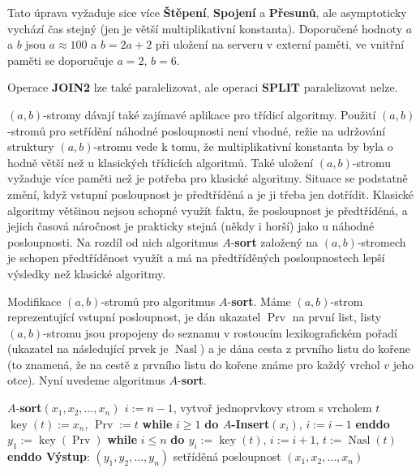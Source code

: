 \documentclass[a4paper,12pt]{article}
\DeclareMathOperator*{\Prv}{Prv}
\DeclareMathOperator*{\Nasl}{Nasl}
\DeclareMathOperator*{\key}{key}
\begin{document}
Tato úprava vyžaduje sice více {\bf Štěpení}, {\bf Spojení} a
{\bf Přesunů}, ale asymptoticky vychází čas stejný 
(jen je větší multiplikativní konstanta). Doporučené 
hodnoty $a$ a $b$ jsou $a\approx 100$ a $b=2a+2$ při uložení na serveru 
v externí paměti, ve vnitřní paměti 
se doporučuje $a=2$, $b=6$.

Operace {\bf JOIN2} lze také paralelizovat, ale operaci {\bf SPLIT  }
paralelizovat nelze.

$(a,b)$-stromy dávají také zajímavé aplikace pro 
třídicí 
algoritmy. Použití $(a,b)$-stromů pro setřídění 
náhodné posloupnosti není vhodné, režie na udržování 
struktury $(a,b)$-stromu vede k tomu, že multiplikativní 
konstanta by byla o hodně větší než u klasických 
třídicích algoritmů. Také uložení $(
a,b)$-stromu 
vyžaduje více paměti než je potřeba pro klasické 
algoritmy. Situace se podstatně změní, když vstupní 
posloupnost je před\-tří\-děná a je ji třeba jen dotřídit. 
Klasické algoritmy většinou nejsou schopné využít faktu, že 
posloupnost je předtříděná, a jejich časová náročnost je 
prakticky stejná (někdy i horší) jako u náhodné 
posloupnosti. Na rozdíl od nich algoritmus $A$-{\bf sort }
založený na $(a,b)$-stromech je schopen předtříděnost 
využít a má na předtříděných posloupnostech lepší 
výsledky než klasické algoritmy.

Modifikace $(a,b)$-stromů pro algoritmus 
$A$-{\bf sort}. Máme $(a,b)$-strom reprezentující vstupní 
posloupnost, je dán ukazatel $\Prv$ na první list, listy 
$(a,b)$-stromu jsou propojeny do seznamu v rostoucím 
lexikografickém pořadí (ukazatel na následující prvek je 
$\Nasl$) a je dána cesta z prvního listu do kořene (to 
znamená, že na cestě z prvního listu do kořene známe 
pro každý vrchol $v$ jeho otce). Nyní uvedeme algoritmus 
$A$-{\bf sort}. 

$A$-{\bf sort$(x_1,x_2,\dots,x_n)$\newline 
$i:=n-1$}, vytvoř jednoprvkovy strom s vrcholem $t$\newline 
$\key(t):=x_n$, $\Prv:=t$\newline 
{\bf while} $i\ge 1$ {\bf do $A$-Insert$(x_i)$}, $i:=i-1$ {\bf enddo}\newline 
$y_1:=\key(\Prv)$\newline 
{\bf while} $i\le n$ {\bf do\newline 
\phantom{---}$y_i:=\key(t)$}, $i:=i+1$, $t:=\Nasl(t)$\newline 
{\bf enddo\newline 
Výstup}: $(y_1,y_2,\dots,y_n)$ setříděná posloupnost $
(x_1,x_2,\dots,x_n)$
\end{document}
